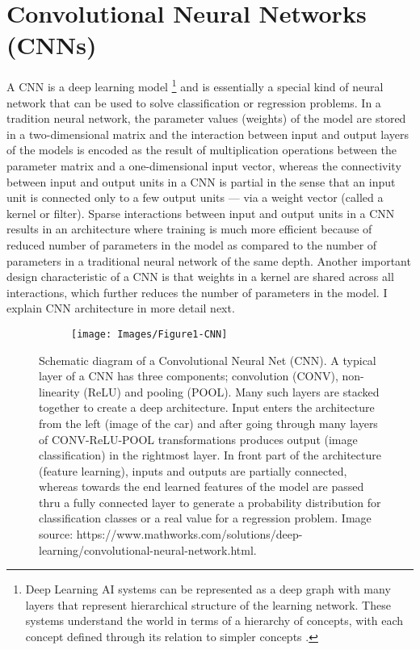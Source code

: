 \documentclass [11pt,letterpaper ,openany ]{report}
\begin{document}
     \section{Convolutional Neural Networks (CNNs)}
     A CNN is a deep learning model \footnote {Deep Learning AI systems can be represented as a deep graph with many layers that represent hierarchical structure of the learning network. These systems understand the world in terms of a hierarchy of concepts, with each concept defined through its relation to simpler concepts \cite{Goodfellow-et-al-2016}.} and is essentially a special kind of neural network that can be used to solve classification or regression problems. In a tradition neural network, the parameter values (weights) of the model are stored in a two-dimensional matrix and the interaction between input and output layers of the models is encoded as the result of multiplication operations between the parameter matrix and a one-dimensional input vector, whereas the connectivity between input and output units in a CNN is partial in the sense that an input unit is connected only to a few output units --- via a weight vector (called a kernel or filter). Sparse interactions between input and output units in a CNN results in an architecture where training is much more efficient because of reduced number of parameters in the model as compared to the number of parameters in a traditional neural network of the same depth. Another important design characteristic of a CNN is that weights in a kernel are shared across all interactions, which further reduces the number of parameters in the model. I explain CNN architecture in more detail next. 

    \begin{figure}[t!]
      \centering
      \begin{subfigure}[b]{0.98\linewidth}
        \texttt{[image: Images/Figure1-CNN]}
      \end{subfigure}
      \caption{Schematic diagram of a Convolutional Neural Net (CNN). A typical layer of a CNN has three components; convolution (CONV), non-linearity (ReLU) and pooling (POOL). Many such layers are stacked together to create a deep architecture. Input enters the architecture from the left (image of the car) and after going through many layers of CONV-ReLU-POOL transformations produces output (image classification) in the rightmost layer. In front part of the architecture (feature learning), inputs and outputs are partially connected, whereas towards the end learned features of the model are passed thru a fully connected layer to generate a probability distribution for classification classes or a real value for a regression problem. Image source: https://www.mathworks.com/solutions/deep-learning/convolutional-neural-network.html.}
      \label{fig:cnn}
    \end{figure}
\end{document}

